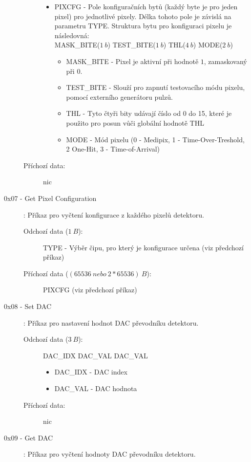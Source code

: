 \begin{description}
\begin{description}
\begin{itemize}
\begin{itemize}
						\end{itemize}
					\item PIXCFG - Pole konfiguračních bytů (každý byte je pro jeden pixel) pro jednotlivé pixely. Délka tohoto pole je závislá na parametru TYPE. Struktura bytu pro konfiguraci pixelu je následovná: \\ MASK\_BITE($1~b$) TEST\_BITE($1~b$) THL($4~b$) MODE($2~b$)
						\begin{itemize}
							\item MASK\_BITE - Pixel je aktivní při hodnotě $1$, zamaskovaný při $0$.
							\item TEST\_BITE - Slouží pro zapnutí testovacího módu pixelu, pomocí externího generátoru pulzů.
							\item THL - Tyto čtyři bity udávají číslo od 0 do 15, které je použito pro posun vůči globální hodnotě THL
							\item MODE - Mód pixelu (0 - Medipix, 1 - Time-Over-Treshold, 2 One-Hit, 3 - Time-of-Arrival)
						\end{itemize}
				\end{itemize}
			\item[Příchozí data:] nic
		\end{description}
	\item[0x07 - Get Pixel Configuration]:
		Příkaz pro vyčtení konfigurace z každého pixelů detektoru.
		\begin{description}
			\item[Odchozí data ($1~B$):] TYPE - Výběr čipu, pro který je konfigurace určena (viz předchozí příkaz)
			\item[Příchozí data ($(65536~nebo~2*65536)~B$):] PIXCFG (viz předchozí příkaz)
		\end{description}
	\item[0x08 - Set DAC]:
		Příkaz pro nastavení hodnot DAC převodníku detektoru.
		\begin{description}
			\item[Odchozí data ($3~B$):] DAC\_IDX DAC\_VAL DAC\_VAL
				\begin{itemize}
					\item DAC\_IDX - DAC index
					\item DAC\_VAL - DAC hodnota
				\end{itemize}
			\item[Příchozí data:] nic
		\end{description}
	\item[0x09 - Get DAC]:
		Příkaz pro vyčtení hodnoty DAC převodníku detektoru.
		\begin{description}

\end{description}
\end{description}
